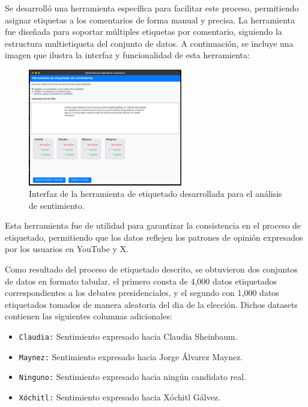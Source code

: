 \documentclass[10pt, a4paper]{article}
\begin{document}
	
	Se desarrolló una herramienta específica para facilitar este proceso, permitiendo asignar etiquetas a los comentarios de forma manual y precisa. La herramienta fue diseñada para soportar múltiples etiquetas por comentario, siguiendo la estructura multietiqueta del conjunto de datos. A continuación, se incluye una imagen que ilustra la interfaz y funcionalidad de esta herramienta:
	
	\begin{figure}[H]
		\centering
		\includegraphics[width=0.6\textwidth]{etiquetado.png}
		\caption{Interfaz de la herramienta de etiquetado desarrollada para el análisis de sentimiento.}
		\label{fig:etiquetado}
	\end{figure}
	
	Esta herramienta fue de utilidad para garantizar la consistencia en el proceso de etiquetado, permitiendo que los datos reflejen los patrones de opinión expresados por los usuarios en YouTube y X.
	
	Como resultado del proceso de etiquetado descrito, se obtuvieron dos conjuntos de datos en formato tabular, el primero consta de 4,000 datos etiquetados correspondientes a los debates presidenciales, y el segundo con 1,000 datos etiquetados tomados de manera aleatoria del dia de la elección. Dichos datasets contienen las siguientes columnas adicionales:
	
	\begin{itemize}
		\item \texttt{Claudia:} Sentimiento expresado hacia Claudia Sheinbaum.
		\item \texttt{Maynez:} Sentimiento expresado hacia Jorge Álvarez Maynez.
		\item \texttt{Ninguno:} Sentimiento expresado hacia ningún candidato real.
		\item \texttt{Xóchitl:} Sentimiento expresado hacia Xóchitl Gálvez.
	\end{itemize}
	
\end{document}
